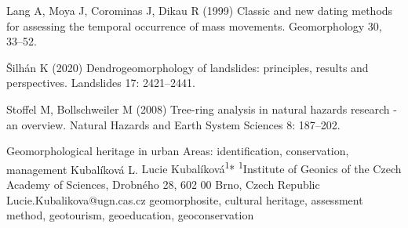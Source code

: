 {Lang A, Moya J, Corominas J, Dikau R (1999) Classic and new dating methods for assessing the temporal occurrence of mass movements. Geomorphology 30, 33–52.

Šilhán K (2020) Dendrogeomorphology of landslides: principles, results and perspectives. Landslides 17: 2421–2441. 

Stoffel M, Bollschweiler M (2008) Tree-ring analysis in natural hazards research - an overview. Natural Hazards and Earth System Sciences 8: 187–202.
}


\abstract
{Geomorphological heritage in urban Areas: identification, conservation, management} 
{Kubalíková L.} 
{Lucie Kubalíková\textsuperscript{1}*} 
{\TLtag} 
{
\textsuperscript{1}Institute of Geonics of the Czech Academy of Sciences, Drobného 28, 602 00 Brno, Czech Republic
}
{Lucie.Kubalikova@ugn.cas.cz}  %
{geomorphosite, cultural heritage, assessment method, geotourism, geoeducation, geoconservation}
